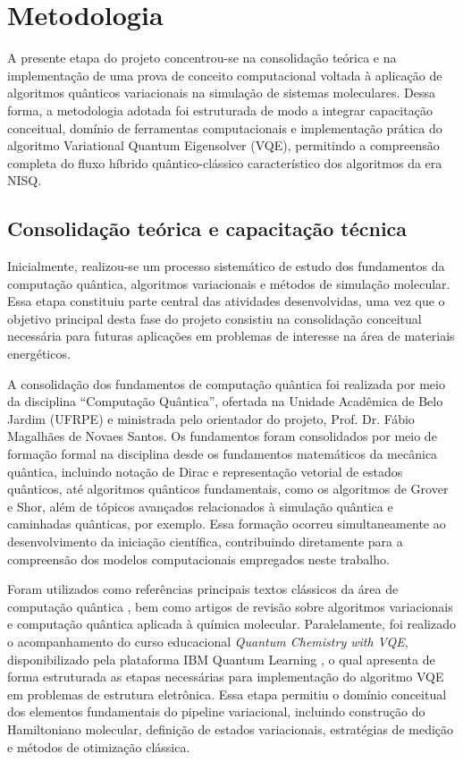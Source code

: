 \section{Metodologia}

A presente etapa do projeto concentrou-se na consolidação teórica e na
implementação de uma prova de conceito computacional voltada à aplicação
de algoritmos quânticos variacionais na simulação de sistemas moleculares.
Dessa forma, a metodologia adotada foi estruturada de modo a integrar
capacitação conceitual, domínio de ferramentas computacionais e
implementação prática do algoritmo Variational Quantum Eigensolver (VQE),
permitindo a compreensão completa do fluxo híbrido quântico-clássico
característico dos algoritmos da era NISQ.

\subsection{Consolidação teórica e capacitação técnica}

Inicialmente, realizou-se um processo sistemático de estudo dos fundamentos
da computação quântica, algoritmos variacionais e métodos de simulação
molecular. Essa etapa constituiu parte central das atividades desenvolvidas,
uma vez que o objetivo principal desta fase do projeto consistiu na
consolidação conceitual necessária para futuras aplicações em problemas
de interesse na área de materiais energéticos.

A consolidação dos fundamentos de computação quântica foi realizada por meio 
da disciplina ``Computação Quântica'', ofertada na Unidade Acadêmica de Belo 
Jardim (UFRPE) e ministrada pelo orientador do projeto, Prof. Dr. Fábio 
Magalhães de Novaes Santos. 
Os fundamentos foram consolidados por meio de formação formal na disciplina 
desde os fundamentos matemáticos da mecânica quântica, incluindo 
notação de Dirac e representação vetorial de estados 
quânticos, até algoritmos quânticos fundamentais, como os algoritmos de 
Grover e Shor, além de tópicos avançados relacionados à simulação quântica e 
caminhadas quânticas, por exemplo. Essa formação ocorreu simultaneamente ao 
desenvolvimento da iniciação científica, contribuindo diretamente para a 
compreensão dos modelos computacionais empregados neste trabalho.

Foram utilizados como referências principais textos clássicos da área de
computação quântica \cite{nielsen2000quantum,hidary2019quantum}, bem como
artigos de revisão sobre algoritmos variacionais e computação quântica
aplicada à química molecular. Paralelamente, foi realizado o acompanhamento
do curso educacional \textit{Quantum Chemistry with VQE}, disponibilizado
pela plataforma IBM Quantum Learning \cite{ibm_vqe_course}, o qual apresenta
de forma estruturada as etapas necessárias para implementação do algoritmo
VQE em problemas de estrutura eletrônica. 
Essa etapa permitiu o domínio conceitual dos elementos fundamentais do
pipeline variacional, incluindo construção do Hamiltoniano molecular,
definição de estados variacionais, estratégias de medição e métodos de
otimização clássica.

